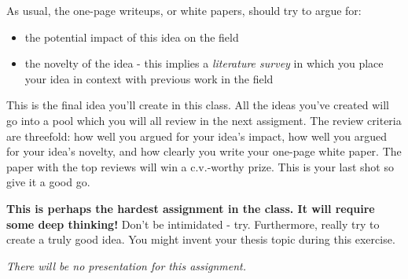\documentclass[11pt]{article}
\begin{document}
As usual, the one-page writeups, or white papers, should try to argue for:
\begin{itemize}
\itemsep=-1pt
\item the potential impact of this idea on the field
\item the novelty of the idea - this implies a {\it literature survey} 
in which you
place your idea in context with previous work in the field
\end{itemize}

This is the final idea you'll create in this class.  All the ideas
you've created will go into a pool which you will all review in the
next assigment.  The review criteria are threefold: how well you
argued for your idea's impact, how well you argued for your idea's
novelty, and how clearly you write your one-page white paper.  The
paper with the top reviews will win a c.v.-worthy prize.  This is your
last shot so give it a good go.

{\bf This is perhaps the hardest assignment in the class.  It will
require some deep thinking!}  Don't be intimidated - try.
Furthermore, really try to create a truly good idea.  You might invent
your thesis topic during this exercise.

{\em There will be no presentation for this assignment.}
\end{document}
